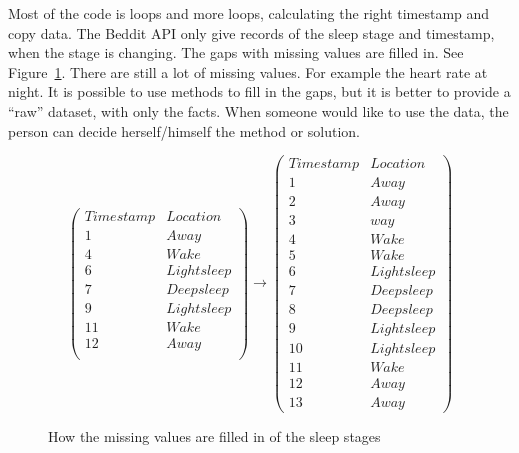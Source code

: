 
			Most of the code is loops and more loops, calculating the right timestamp and copy data. 
			The Beddit API only give records of the sleep stage and timestamp, when the stage is changing. The gaps with missing values are filled in. See Figure~\ref{fig:missingvalues}. There are still a lot of missing values. For example the heart rate at night. It is possible to use methods to fill in the gaps, but it is better to provide a ``raw'' dataset, with only the facts. When someone would like to use the data, the person can decide herself/himself the method or solution.
			\begin{figure}[h!]
			\[ 
				\left(
				\begin{array}{rc}
				Timestamp & Location \\ \hline
				1 & Away \\
				4 & Wake \\
				6 & Light sleep \\
				7 & Deep sleep \\
				9 & Light sleep \\
				11 & Wake \\
				12 & Away \\
				\end{array}
				\right)
				\to
				\left(
				\begin{array}{rc}
				Timestamp & Location \\ \hline
				1 & Away \\
				2 & Away \\
				3 & way \\
				4 & Wake \\
				5 & Wake \\
				6 & Light sleep \\
 				7 & Deep sleep \\
				8 & Deep sleep \\
				9 & Light sleep \\
				10 & Light sleep \\
				11 & Wake \\
				12 & Away \\
				13 & Away 
				\end{array}
				\right)
			\] 
			\caption{How the missing values are filled in of the sleep stages}
			\label{fig:missingvalues}
		\end{figure}
		




